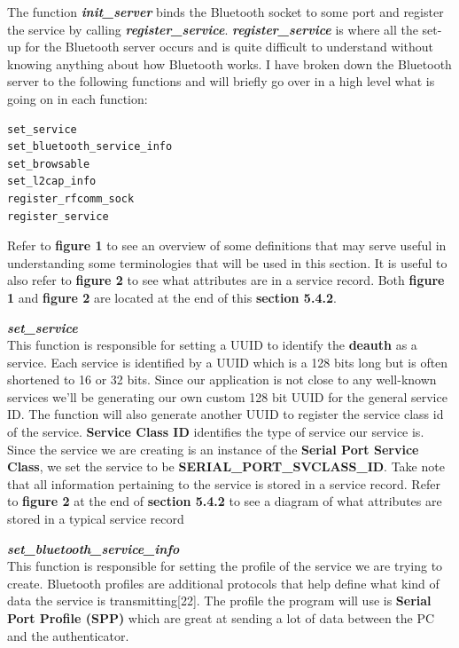 \documentclass[letterpaper,twocolumn,10pt]{article}
\begin{document}
The function \textbf{\emph{init\_server}} binds the Bluetooth socket to some port and register the service by calling \textbf{\emph{register\_service}}. \textbf{\emph{register\_service}} is where all the set-up for the Bluetooth server occurs and is quite difficult to understand without knowing anything about how Bluetooth works. I have broken down the Bluetooth server to the following functions and will briefly go over in a high level what is going on in each function:
{\small
\begin{lstlisting}
set_service
set_bluetooth_service_info
set_browsable
set_l2cap_info
register_rfcomm_sock
register_service
\end{lstlisting}

Refer to \textbf{figure 1} to see an overview of some definitions that may serve useful in understanding some terminologies that will be used in this section. It is useful to also refer to \textbf{figure 2} to see what attributes are in a service record. Both \textbf{figure 1} and \textbf{figure 2} are located at the end of this \textbf{section 5.4.2}.

\hrulefill

\textbf{\emph{set\_service}}\\
This function is responsible for setting a UUID to identify the \textbf{deauth} as a service. Each service is identified by a UUID which is a 128 bits long but is often shortened to 16 or 32 bits. Since our application is not close to any well-known services we'll be generating our own custom 128 bit UUID for the general service ID. The function will also generate another UUID to register the service class id of the service. \textbf{Service Class ID} identifies the type of service our service is. Since the service we are creating is an instance of the \textbf{Serial Port Service Class}, we set the service to be \textbf{SERIAL\_PORT\_SVCLASS\_ID}. Take note that all information pertaining to the service is stored in a service record. Refer to \textbf{figure 2} at the end of \textbf{section 5.4.2} to see a diagram of what attributes are stored in a typical service record

\hrulefill

\textbf{\emph{set\_bluetooth\_service\_info}}\\
This function is responsible for setting the profile of the service we are trying to create. Bluetooth profiles are additional protocols that help define what kind of data the service is transmitting[22]. The profile the program will use is \textbf{Serial Port Profile (SPP)} which are great at sending a lot of data between the PC and the authenticator.

}
\end{document}
